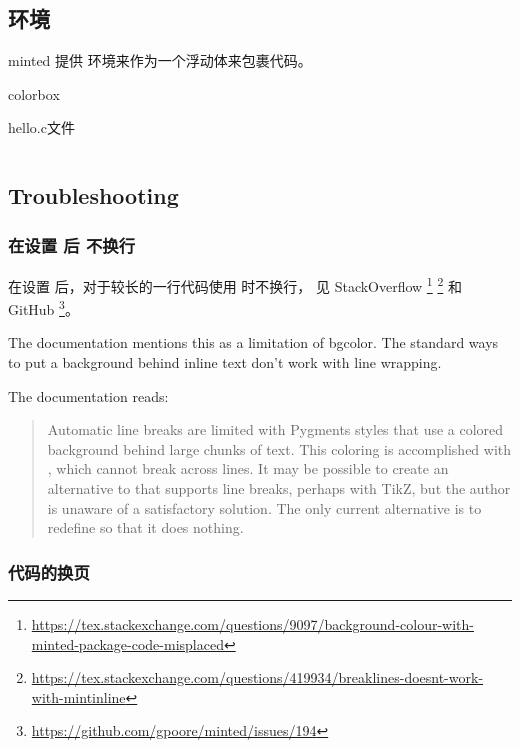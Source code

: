 \subsection{\protect{} 环境}

minted 提供  环境来作为一个浮动体来包裹代码。

\begin{latexcode}{colorbox}
\begin{listing}[H]
  \caption{hello.c文件}
  \inputminted{c}{snippets/codelistings/helloworld.c}
\end{listing}
\end{latexcode}

\subsection{Troubleshooting}

\subsubsection{在设置 \protect{} 后 \protect{} 不换行}

在设置  后，对于较长的一行代码使用  时不换行，
见 StackOverflow
\footnote{\url{https://tex.stackexchange.com/questions/9097/background-colour-with-minted-package-code-misplaced}}
\footnote{\url{https://tex.stackexchange.com/questions/419934/breaklines-doesnt-work-with-mintinline}}
和 GitHub
\footnote{\url{https://github.com/gpoore/minted/issues/194}}。

The documentation mentions this as a limitation of bgcolor. The standard ways to put a background behind inline text don't work with line wrapping.

The documentation reads:

\begin{quote}
  Automatic line breaks are limited with Pygments styles that use a colored background behind large chunks of text. This coloring is accomplished with ,
  which cannot break across lines. It may be possible to create an alternative to
   that supports line breaks, perhaps with TikZ, but the author is unaware
  of a satisfactory solution. The only current alternative is to redefine  so
  that it does nothing. 
\end{quote}

\subsubsection{代码的换页}

